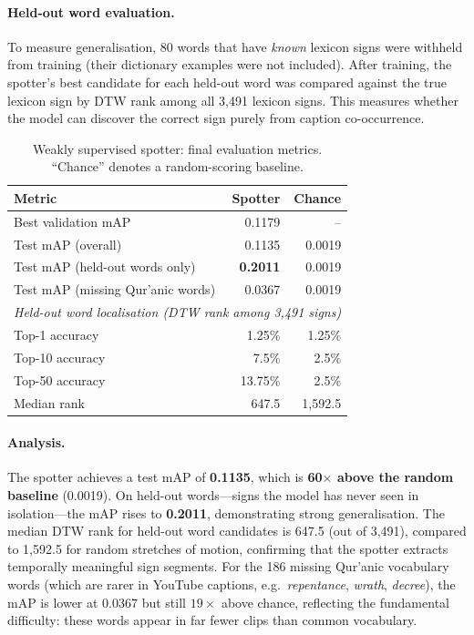 \paragraph{Held-out word evaluation.} To measure generalisation, 80 words that have \emph{known} lexicon signs were withheld from training (their dictionary examples were not included). After training, the spotter's best candidate for each held-out word was compared against the true lexicon sign by DTW rank among all 3,491 lexicon signs. This measures whether the model can discover the correct sign purely from caption co-occurrence.

\begin{table}[ht]
\centering\small
\caption{Weakly supervised spotter: final evaluation metrics. ``Chance'' denotes a random-scoring baseline.}
\label{tab:spotter_eval}
\begin{tabular}{l r r}
\toprule
Metric & Spotter & Chance \\
\midrule
Best validation mAP & 0.1179 & -- \\
Test mAP (overall) & 0.1135 & 0.0019 \\
Test mAP (held-out words only) & \textbf{0.2011} & 0.0019 \\
Test mAP (missing Qur'anic words) & 0.0367 & 0.0019 \\
\midrule
\multicolumn{3}{l}{\emph{Held-out word localisation (DTW rank among 3,491 signs)}} \\
Top-1 accuracy & 1.25\% & 1.25\% \\
Top-10 accuracy & 7.5\% & 2.5\% \\
Top-50 accuracy & 13.75\% & 2.5\% \\
Median rank & 647.5 & 1,592.5 \\
\bottomrule
\end{tabular}
\end{table}

\paragraph{Analysis.} The spotter achieves a test mAP of \textbf{0.1135}, which is \textbf{60$\times$ above the random baseline} (0.0019). On held-out words—signs the model has never seen in isolation—the mAP rises to \textbf{0.2011}, demonstrating strong generalisation. The median DTW rank for held-out word candidates is 647.5 (out of 3,491), compared to 1,592.5 for random stretches of motion, confirming that the spotter extracts temporally meaningful sign segments. For the 186 missing Qur'anic vocabulary words (which are rarer in YouTube captions, e.g.\ \emph{repentance}, \emph{wrath}, \emph{decree}), the mAP is lower at 0.0367 but still $19\times$ above chance, reflecting the fundamental difficulty: these words appear in far fewer clips than common vocabulary.


